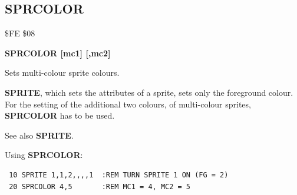 
\newpage
\subsection{SPRCOLOR}
\begin{description}[leftmargin=2cm,style=nextline]
\item [Token:] \$FE \$08
\item [Format:] {\bf SPRCOLOR [mc1] [,mc2]}
\item [Usage:]  Sets multi-colour sprite colours.

                {\bf SPRITE}, which sets the
                attributes of a sprite, sets only the foreground
                colour. For the setting of the  additional two colours,
                of multi-colour sprites, {\bf SPRCOLOR} has
                to be used.

\item [Remarks:] See also {\bf SPRITE}.

\item [Example:] Using {\bf SPRCOLOR}:
\begin{tcolorbox}[colback=black,coltext=white]
\verbatimfont{\codefont}
\begin{verbatim}
 10 SPRITE 1,1,2,,,,1  :REM TURN SPRITE 1 ON (FG = 2)
 20 SPRCOLOR 4,5       :REM MC1 = 4, MC2 = 5
\end{verbatim}
\end{tcolorbox}
\end{description}


\newpage
